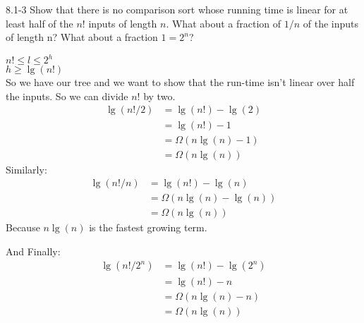 \begin{problem}{8.1-3}
  Show that there is no comparison sort whose running time is linear for at least half of the $n!$ inputs of length $n$.
  What about a fraction of $1/n$ of the inputs of length n? What about a fraction $1=2^n$?
  \begin{solution}
    $n! \le l \le 2^h$ \\
    $h \ge \lg(n!)$
    \vspace{12pt} \\
    So we have our tree and we want to show that the run-time isn't linear over half the inputs. So we can divide $n!$
    by two.
    \begin{align*}
      \lg(n!/2) &= \lg(n!) - \lg(2) \\
      &= \lg(n!) - 1 \\
      &= \Omega(n\lg(n) - 1) \\
      &= \Omega(n\lg(n))
    \end{align*}
    Similarly:
    \vspace{12pt}
    \begin{align*}
      \lg(n!/n) &= \lg(n!) - \lg(n) \\
      &= \Omega(n\lg(n) - \lg(n)) \\
      &= \Omega(n\lg(n))
    \end{align*}
      Because $n\lg(n)$ is the fastest growing term.
      \vspace{12pt}

      \noindent And Finally:
      \begin{align*}
        \lg(n!/2^n) &= \lg(n!) - \lg(2^n) \\
        &= \lg(n!) - n \\
        &= \Omega(n\lg(n) - n) \\
        &= \Omega(n\lg(n))
      \end{align*}
  \end{solution}
\end{problem} \newpage

